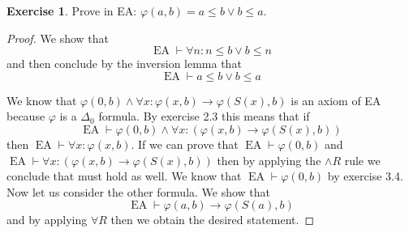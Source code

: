 \documentclass{article}
\theoremstyle{definition}
\newtheorem{question}{Exercise}
\DeclareMathOperator{\ea}{EA}
\begin{document}
\begin{question}
    Prove in EA: \(\varphi(a,b)=a\leq b\vee b\leq a\).

    \begin{proof}
        We show that
        \begin{equation}
            \ea\vdash\forall n:n\leq b\vee b\leq n
        \end{equation}
        and then
        conclude by the inversion lemma that
        \begin{equation}
            \ea\vdash a\leq b\vee b\leq a
        \end{equation}

        We know that \(\varphi(0,b)\wedge\forall
        x:\varphi(x,b)\to\varphi(S(x),b)\) is an axiom of EA because \(\varphi\)
        is a \(\Delta_{0}\) formula. By exercise 2.3 this means that if
        \begin{equation}
            \ea\vdash\varphi(0,b)\wedge\forall x:(\varphi(x,b)\to\varphi(S(x),b)) \label{eq:antec-induc1}
        \end{equation}
        then \(\ea\vdash\forall x:\varphi(x,b)\). If we can prove that
        \(\ea\vdash\varphi(0,b)\) and \(\ea\vdash\forall
        x:(\varphi(x,b)\to\varphi(S(x),b))\) then by applying the \(\wedge R\)
        rule we conclude that  must hold as well. We know
        that \(\ea\vdash\varphi(0,b)\) by exercise 3.4. Now let us consider the
        other formula. We show that
        \begin{equation}
            \ea\vdash\varphi(a,b)\to\varphi(S(a),b)
        \end{equation}
        and by applying \(\forall R\) then we obtain the desired statement.


\end{proof}
\end{question}
\end{document}

